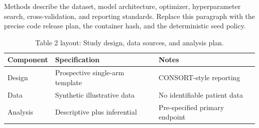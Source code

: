 
Methods describe the dataset, model architecture, optimizer, hyperparameter search, cross-validation, and reporting standards. Replace this paragraph with the precise code release plan, the container hash, and the deterministic seed policy.

\begin{table}[H]
\caption{Table 2 layout: Study design, data sources, and analysis plan.}
\label{tab:methods_design}
\centering
\begin{tabular}{>{\raggedright\arraybackslash}p{3.4cm} >{\raggedright\arraybackslash}p{4.6cm} >{\raggedright\arraybackslash}p{5.4cm}}
\toprule
\textbf{Component} & \textbf{Specification} & \textbf{Notes} \\
\midrule
  Design & Prospective single-arm template & CONSORT-style reporting \\
  Data & Synthetic illustrative data & No identifiable patient data \\
  Analysis & Descriptive plus inferential & Pre-specified primary endpoint \\
\bottomrule
\end{tabular}
\end{table}
